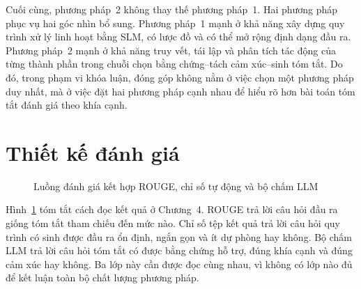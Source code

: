 Cuối cùng, phương pháp~2 không thay thế phương pháp~1. Hai phương pháp phục vụ hai góc nhìn bổ sung. Phương pháp~1 mạnh ở khả năng xây dựng quy trình xử lý linh hoạt bằng SLM, có lược đồ và có thể mở rộng định dạng đầu ra. Phương pháp~2 mạnh ở khả năng truy vết, tái lập và phân tích tác động của từng thành phần trong chuỗi chọn bằng chứng--tách cảm xúc--sinh tóm tắt. Do đó, trong phạm vi khóa luận, đóng góp không nằm ở việc chọn một phương pháp duy nhất, mà ở việc đặt hai phương pháp cạnh nhau để hiểu rõ hơn bài toán tóm tắt đánh giá theo khía cạnh.

\section{Thiết kế đánh giá}

\begin{figure}[tbp]
\centering
{}
\caption{Luồng đánh giá kết hợp ROUGE, chỉ số tự động và bộ chấm LLM}
\label{fig:evaluation-flow}
\end{figure}

Hình~\ref{fig:evaluation-flow} tóm tắt cách đọc kết quả ở Chương~4. ROUGE trả lời câu hỏi đầu ra giống tóm tắt tham chiếu đến mức nào. Chỉ số tệp kết quả trả lời câu hỏi quy trình có sinh được đầu ra ổn định, ngắn gọn và ít dự phòng hay không. Bộ chấm LLM trả lời câu hỏi tóm tắt có được bằng chứng hỗ trợ, đúng khía cạnh và đúng cảm xúc hay không. Ba lớp này cần được đọc cùng nhau, vì không có lớp nào đủ để kết luận toàn bộ chất lượng phương pháp.
